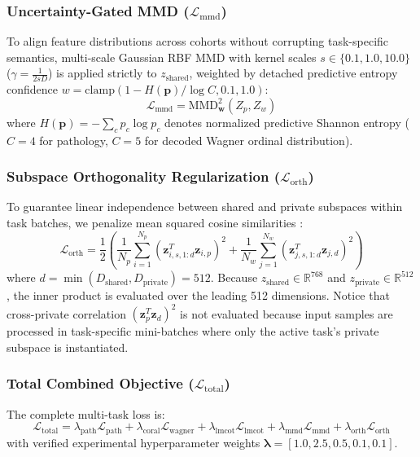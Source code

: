 \documentclass[journal]{IEEEtran}
\begin{document}
\subsubsection{Uncertainty-Gated MMD ($\mathcal{L}_{\text{mmd}}$)}
To align feature distributions across cohorts without corrupting task-specific semantics, multi-scale Gaussian RBF MMD \cite{gretton2012kernel} with kernel scales $s \in \{0.1, 1.0, 10.0\}$ ($\gamma = \frac{1}{2 s D}$) is applied strictly to $z_{\text{shared}}$, weighted by detached predictive entropy confidence $w = \text{clamp}(1 - H(\mathbf{p})/\log C, 0.1, 1.0)$:
\begin{equation}
    \mathcal{L}_{\text{mmd}} = \text{MMD}^2_{\mathbf{w}}\left(Z_p, Z_w\right)
\end{equation}
where $H(\mathbf{p}) = -\sum_{c} p_c \log p_c$ denotes normalized predictive Shannon entropy ($C=4$ for pathology, $C=5$ for decoded Wagner ordinal distribution).

\subsubsection{Subspace Orthogonality Regularization ($\mathcal{L}_{\text{orth}}$)}
To guarantee linear independence between shared and private subspaces within task batches, we penalize mean squared cosine similarities \cite{bousmalis2016domain}:
\begin{equation}
    \mathcal{L}_{\text{orth}} = \frac{1}{2} \left( \frac{1}{N_p} \sum_{i=1}^{N_p} \left( \mathbf{z}_{i, s, 1:d}^T \mathbf{z}_{i, p} \right)^2 + \frac{1}{N_w} \sum_{j=1}^{N_w} \left( \mathbf{z}_{j, s, 1:d}^T \mathbf{z}_{j, d} \right)^2 \right)
\end{equation}
where $d = \min(D_{\text{shared}}, D_{\text{private}}) = 512$. Because $z_{\text{shared}} \in \mathbb{R}^{768}$ and $z_{\text{private}} \in \mathbb{R}^{512}$, the inner product is evaluated over the leading 512 dimensions. Notice that cross-private correlation $(\mathbf{z}_p^T \mathbf{z}_d)^2$ is not evaluated because input samples are processed in task-specific mini-batches where only the active task's private subspace is instantiated.

\subsubsection{Total Combined Objective ($\mathcal{L}_{\text{total}}$)}
The complete multi-task loss is:
\begin{equation}
    \mathcal{L}_{\text{total}} = \lambda_{\text{path}} \mathcal{L}_{\text{path}} + \lambda_{\text{coral}} \mathcal{L}_{\text{wagner}} + \lambda_{\text{lmcot}} \mathcal{L}_{\text{lmcot}} + \lambda_{\text{mmd}} \mathcal{L}_{\text{mmd}} + \lambda_{\text{orth}} \mathcal{L}_{\text{orth}}
\end{equation}
with verified experimental hyperparameter weights $\boldsymbol{\lambda} = [1.0, 2.5, 0.5, 0.1, 0.1]$.
\end{document}
